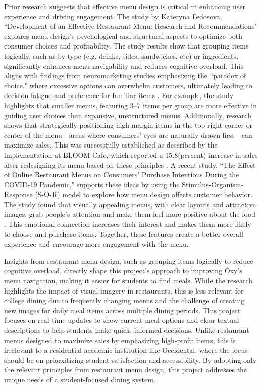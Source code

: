 \documentclass[10pt,twocolumn]{article}
\begin{document}
Prior research suggests that effective menu design is critical in enhancing user experience and driving engagement. The study by Kateryna Fedosova, ``Development of an Effective Restaurant Menu: Research and Recommendations" explores menu design's psychological and structural aspects to optimize both consumer choices and profitability. The study results show that grouping items logically, such as by type (e.g. drinks, sides, sandwiches, etc) or ingredients, significantly enhances menu navigability and reduces cognitive overload. This aligns with findings from neuromarketing studies emphasizing the ``paradox of choice," where excessive options can overwhelm customers, ultimately leading to decision fatigue and preference for familiar items \cite{Fedosova2022}. For example, the study highlights that smaller menus, featuring 3–7 items per group are more effective in guiding user choices than expansive, unstructured menus.
Additionally,  research shows that strategically positioning high-margin items in the top-right corner or center of the menu—areas where consumers' eyes are naturally drawn first—can maximize sales. This was successfully established as described by the implementation at BLOOM Cafe, which reported a 15.8(percent) increase in sales after redesigning its menu based on these principles \cite{Fedosova2022}.
A recent study, ``The Effect of Online Restaurant Menus on Consumers’ Purchase Intentions During the COVID-19 Pandemic," supports these ideas by using the Stimulus-Organism-Response (S-O-R) model to explore how menu design affects customer behavior. The study found that visually appealing menus, with clear layouts and attractive images, grab people’s attention and make them feel more positive about the food \cite{Covid2021}. This emotional connection increases their interest and makes them more likely to choose and purchase items. Together, these features create a better overall experience and encourage more engagement with the menu. 

Insights from restaurant menu design, such as grouping items logically to reduce cognitive overload, directly shape this project's approach to improving Oxy’s menu navigation, making it easier for students to find meals. While the research highlights the impact of visual imagery in restaurants, this is less relevant for college dining due to frequently changing menus and the challenge of creating new images for daily meal items across multiple dining periods. This project focuses on real-time updates to show current meal options and clear textual descriptions to help students make quick, informed decisions. Unlike restaurant menus designed to maximize sales by emphasizing high-profit items, this is irrelevant to a residential academic institution like Occidental, where the focus should be on priorxitizing student satisfaction and accessibility. By adopting only the relevant principles from restaurant menu design, this project addresses the unique needs of a student-focused dining system.
\end{document}
